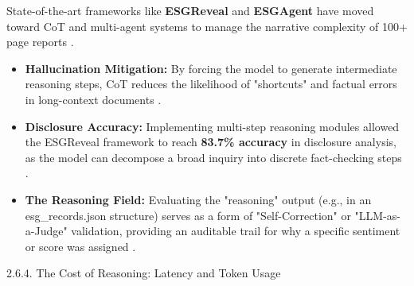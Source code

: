 \documentclass{article}
\begin{document}
State-of-the-art frameworks like \textbf{ESGReveal} and \textbf{ESGAgent} have moved toward CoT and multi-agent systems to manage the narrative complexity of 100+ page reports  \parencite[]{yilei_zhao_b7bbd9c8, yi_zou_37c055f7}.
\begin{itemize}
\item 

\textbf{Hallucination Mitigation:} By forcing the model to generate intermediate reasoning steps, CoT reduces the likelihood of "shortcuts" and factual errors in long-context documents  \parencite{siqi_sun_f6a51152}.\item 

\textbf{Disclosure Accuracy:} Implementing multi-step reasoning modules allowed the ESGReveal framework to reach \textbf{83.7\% accuracy} in disclosure analysis, as the model can decompose a broad inquiry into discrete fact-checking steps  \parencite{yi_zou_37c055f7}.\item 

\textbf{The Reasoning Field:} Evaluating the "reasoning" output (e.g., in an esg\_records.json structure) serves as a form of "Self-Correction" or "LLM-as-a-Judge" validation, providing an auditable trail for why a specific sentiment or score was assigned  \parencite{siqi_sun_f6a51152}.
\end{itemize}2.6.4. The Cost of Reasoning: Latency and Token Usage
\end{document}
